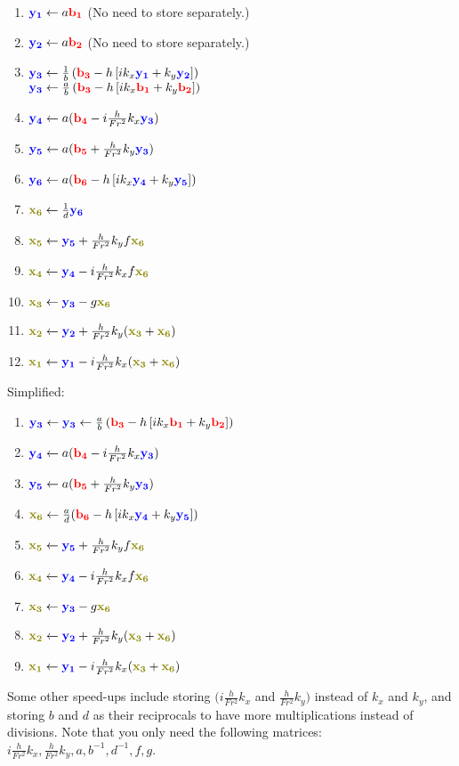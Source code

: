 \documentclass[10pt]{article}
\newcommand{\mbfb}[1]{{\color{blue}\mathbf{#1}}}
\newcommand{\mbfr}[1]{{\color{red}\mathbf{#1}}}
\newcommand{\mbfg}[1]{{\color{olive}\mathbf{#1}}}
\begin{document}
\begin{enumerate}
	\item $\mbfb{y_1}\gets a\mbfr{b_1}$ (No need to store separately.)
	\item $\mbfb{y_2}\gets a \mbfr{b_2}$ (No need to store separately.)
	\item $\mbfb{y_3} \gets \frac{1}{b} \left(\mbfr{b_3} -h \left[i k_x \mbfb{y_1} + k_y \mbfb{y_2}\right]\right)$ \\ 
	$\mbfb{y_3} \gets \frac{a}{b} \left(\mbfr{b_3} -h \left[i k_x \mbfr{b_1} + k_y \mbfr{b_2}\right]\right)$ 
	\item $\mbfb{y_4} \gets a(\mbfr{b_4} - i \frac{h}{Fr^2}k_x \mbfb{y_3})$
	\item $\mbfb{y_5} \gets a(\mbfr{b_5} + \frac{h}{Fr^2}k_y \mbfb{y_3})$
	\item $\mbfb{y_6} \gets a(\mbfr{b_6} -h \left[ik_x \mbfb{y_4} +k_y\mbfb{y_5}\right])$
	\item $\mbfg{x_6} \gets \frac{1}{d}\mbfb{y_6}$
	\item $\mbfg{x_5} \gets \mbfb{y_5} +\frac{h}{Fr^2}k_yf\mbfg{x_6}$
	\item $\mbfg{x_4} \gets \mbfb{y_4} - i \frac{h}{Fr^2}k_xf\mbfg{x_6}$
	\item $\mbfg{x_3} \gets \mbfb{y_3} - g\mbfg{x_6}$
	\item $\mbfg{x_2}\gets \mbfb{y_2} + \frac{h}{Fr^2}k_y(\mbfg{x_3}+\mbfg{x_6})$
	\item $\mbfg{x_1} \gets \mbfb{y_1} - i \frac{h}{Fr^2}k_x(\mbfg{x_3}+\mbfg{x_6})$
\end{enumerate}

Simplified:

\begin{enumerate}
	\item $\mbfb{y_3} \gets \mbfb{y_3} \gets \frac{a}{b} \left(\mbfr{b_3} -h \left[i k_x \mbfr{b_1} + k_y \mbfr{b_2}\right]\right)$ 
	\item $\mbfb{y_4} \gets a(\mbfr{b_4} - i \frac{h}{Fr^2}k_x \mbfb{y_3})$
	\item $\mbfb{y_5} \gets a(\mbfr{b_5} + \frac{h}{Fr^2}k_y \mbfb{y_3})$
	\item $\mbfg{x_6} \gets \frac{a}{d}(\mbfr{b_6} -h \left[ik_x \mbfb{y_4} +k_y\mbfb{y_5}\right])$
	\item $\mbfg{x_5} \gets \mbfb{y_5} +\frac{h}{Fr^2}k_yf\mbfg{x_6}$
	\item $\mbfg{x_4} \gets \mbfb{y_4} - i \frac{h}{Fr^2}k_xf\mbfg{x_6}$
	\item $\mbfg{x_3} \gets \mbfb{y_3} - g\mbfg{x_6}$
	\item $\mbfg{x_2}\gets \mbfb{y_2} + \frac{h}{Fr^2}k_y(\mbfg{x_3}+\mbfg{x_6})$
	\item $\mbfg{x_1} \gets \mbfb{y_1} - i \frac{h}{Fr^2}k_x(\mbfg{x_3}+\mbfg{x_6})$
\end{enumerate}
Some other speed-ups include storing $(i \frac{h}{Fr^2} k_x$ and $ \frac{h}{Fr^2}k_y)$ instead of $k_x$ and $k_y$, and storing $b$ and $d$ as their reciprocals to have more multiplications instead of divisions. 
Note that you only need the following matrices: $i \frac{h}{Fr^2} k_x, \frac{h}{Fr^2}k_y, a, b^{-1}, d^{-1}, f, g$.
\end{document}
